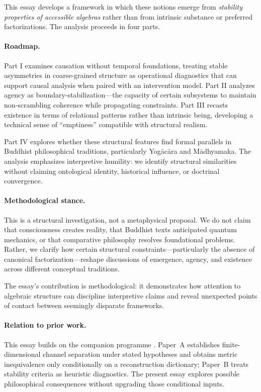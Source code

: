 \documentclass[11pt,a4paper]{article}
\begin{document}
This essay develops a framework in which these notions emerge from \emph{stability properties of accessible algebras} rather than from intrinsic substance or preferred factorizations. The analysis proceeds in four parts.

\paragraph{Roadmap.}
Part I examines causation without temporal foundations, treating stable asymmetries in coarse-grained structure as operational diagnostics that can support causal analysis when paired with an intervention model. Part II analyzes agency as boundary-stabilization—the capacity of certain subsystems to maintain non-scrambling coherence while propagating constraints. Part III recasts existence in terms of relational patterns rather than intrinsic being, developing a technical sense of ``emptiness'' compatible with structural realism.

Part IV explores whether these structural features find formal parallels in Buddhist philosophical traditions, particularly Yog\=ac\=ara and M\=adhyamaka. The analysis emphasizes interpretive humility: we identify structural similarities without claiming ontological identity, historical influence, or doctrinal convergence.

\paragraph{Methodological stance.}
This is a structural investigation, not a metaphysical proposal. We do not claim that consciousness creates reality, that Buddhist texts anticipated quantum mechanics, or that comparative philosophy resolves foundational problems. Rather, we clarify how certain structural constraints—particularly the absence of canonical factorization—reshape discussions of emergence, agency, and existence across different conceptual traditions.

The essay's contribution is methodological: it demonstrates how attention to algebraic structure can discipline interpretive claims and reveal unexpected points of contact between seemingly disparate frameworks.

\paragraph{Relation to prior work.}
This essay builds on the companion programme \cite{Liu2026PaperA,Liu2026PaperB}.  Paper~A establishes finite-dimensional channel separation under stated hypotheses and obtains metric inequivalence only conditionally on a reconstruction dictionary; Paper~B treats stability criteria as heuristic diagnostics.  The present essay explores possible philosophical consequences without upgrading those conditional inputs.
\end{document}
